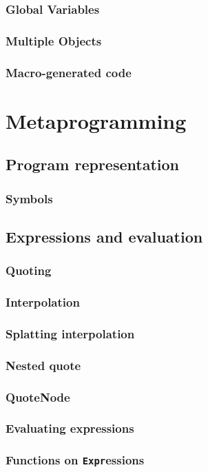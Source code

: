     \subsection{Global Variables}
    \subsection{Multiple Objects}
    \subsection{Macro-generated code}
  \chapter{Metaprogramming}
    \section{Program representation}
    \subsection{Symbols}
    \section{Expressions and evaluation}
    \subsection{Quoting}
    \subsection{Interpolation}
    \subsection{Splatting interpolation}
    \subsection{Nested quote}
    \subsection{QuoteNode}
    \subsection{Evaluating expressions}
    \subsection{Functions on \texttt{Expr}essions}
